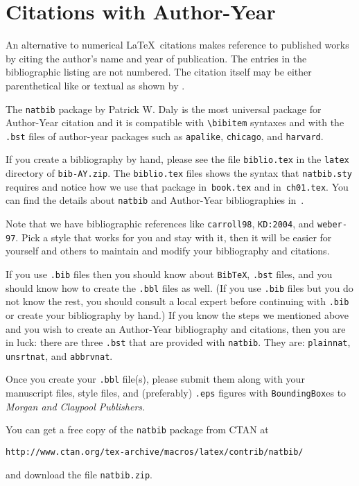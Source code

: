 

\chapter{Citations with Author-Year}
\label{ch06}

An alternative to numerical \LaTeX\ citations makes reference to published
works by citing the author's name and year of publication. The entries in 
the bibliographic listing are not numbered. The citation itself may be 
either parenthetical like \citep{carroll98} or textual as shown by
\citet{carroll98}.

The \verb+natbib+ package by Patrick W. Daly is the most universal package
for Author-Year citation and it is compatible with \verb+\bibitem+ syntaxes
and with the \verb+.bst+ files of author-year packages such as
\verb+apalike+, \verb+chicago+, and \verb+harvard+.

If you create a bibliography by hand, please see the file \verb+biblio.tex+
in the \verb+latex+ directory of \verb+bib-AY.zip+.
The \verb+biblio.tex+ files shows the syntax that \verb+natbib.sty+ 
requires and notice how we use
that package in~\verb+book.tex+ and in~\verb+ch01.tex+. 
You can find the details about \verb+natbib+ and Author-Year bibliographies
in~\citet[pages~218-221]{KD:2004}.

Note that we have bibliographic references like \verb+carroll98+,
\verb+KD:2004+, and \verb+weber-97+. Pick a style that works for you
and stay with it, then it will be easier for yourself and others to 
maintain and modify your bibliography and citations.

If you use \verb+.bib+ files then you should know about \verb+BibTeX+,
\verb+.bst+ files, and you should know how to create the \verb+.bbl+
files as well.
(If you use \verb+.bib+ files but you do not know the rest, you should
consult a local expert before continuing with \verb+.bib+ or create
your bibliography by hand.)
If you know the steps we mentioned above and you wish to create an 
Author-Year bibliography and citations, then you are in luck: 
there are three \verb+.bst+ that are provided with \verb+natbib+.
They are: \verb+plainnat+, \verb+unsrtnat+, and \verb+abbrvnat+.

Once you create your \verb+.bbl+ file(s), please submit them along with
your manuscript files, style files, and (preferably) \verb+.eps+ figures with 
\verb+BoundingBox+es to \textit{Morgan and Claypool Publishers.}

You can get a free copy of the \verb+natbib+ package  from CTAN at
\begin{center}
\verb+http://www.ctan.org/tex-archive/macros/latex/contrib/natbib/+
\end{center}
and download the file \verb+natbib.zip+.

